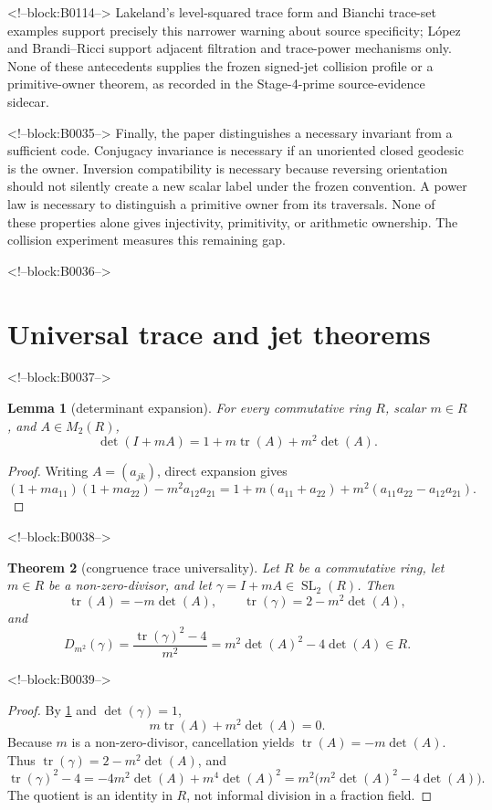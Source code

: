 \documentclass[11pt,a4paper]{article}
\newtheorem{theorem}{Theorem}[section]
\newtheorem{lemma}[theorem]{Lemma}
\theoremstyle{definition}
\theoremstyle{remark}
\newcommand{\SL}{\operatorname{SL}}
\newcommand{\tr}{\operatorname{tr}}
\begin{document}
<!--block:B0114-->
Lakeland's level-squared trace form and Bianchi trace-set examples support precisely this narrower warning about source specificity; López and Brandi--Ricci support adjacent filtration and trace-power mechanisms only. None of these antecedents supplies the frozen signed-jet collision profile or a primitive-owner theorem, as recorded in the Stage-4-prime source-evidence sidecar.

<!--block:B0035-->
Finally, the paper distinguishes a necessary invariant from a sufficient code. Conjugacy invariance is necessary if an unoriented closed geodesic is the owner. Inversion compatibility is necessary because reversing orientation should not silently create a new scalar label under the frozen convention. A power law is necessary to distinguish a primitive owner from its traversals. None of these properties alone gives injectivity, primitivity, or arithmetic ownership. The collision experiment measures this remaining gap.

<!--block:B0036-->
\section{Universal trace and jet theorems}\label{sec:theorems}

<!--block:B0037-->
\begin{lemma}[determinant expansion]\label{lem:detexp}
For every commutative ring \(R\), scalar \(m\in R\), and \(A\in M_2(R)\),
\[
 \det(I+mA)=1+m\tr(A)+m^2\det(A).
\]
\end{lemma}
\begin{proof}
Writing \(A=(a_{jk})\), direct expansion gives
\[
 (1+ma_{11})(1+ma_{22})-m^2a_{12}a_{21}
 =1+m(a_{11}+a_{22})+m^2(a_{11}a_{22}-a_{12}a_{21}).
\]
\end{proof}

<!--block:B0038-->
\begin{theorem}[congruence trace universality]\label{thm:universal}
Let \(R\) be a commutative ring, let \(m\in R\) be a non-zero-divisor, and let \(\gamma=I+mA\in\SL_2(R)\). Then
\[
 \tr(A)=-m\det(A),\qquad \tr(\gamma)=2-m^2\det(A),
\]
and
\begin{equation}\label{eq:universal}
 D_{m^2}(\gamma)=\frac{\tr(\gamma)^2-4}{m^2}
 =m^2\det(A)^2-4\det(A)\in R.
\end{equation}
\end{theorem}

<!--block:B0039-->
\begin{proof}
By \cref{lem:detexp} and \(\det(\gamma)=1\),
\[
 m\tr(A)+m^2\det(A)=0.
\]
Because \(m\) is a non-zero-divisor, cancellation yields \(\tr(A)=-m\det(A)\). Thus \(\tr(\gamma)=2-m^2\det(A)\), and
\[
 \tr(\gamma)^2-4
 =-4m^2\det(A)+m^4\det(A)^2
 =m^2\bigl(m^2\det(A)^2-4\det(A)\bigr).
\]
The quotient is an identity in \(R\), not informal division in a fraction field.
\end{proof}
\end{document}
